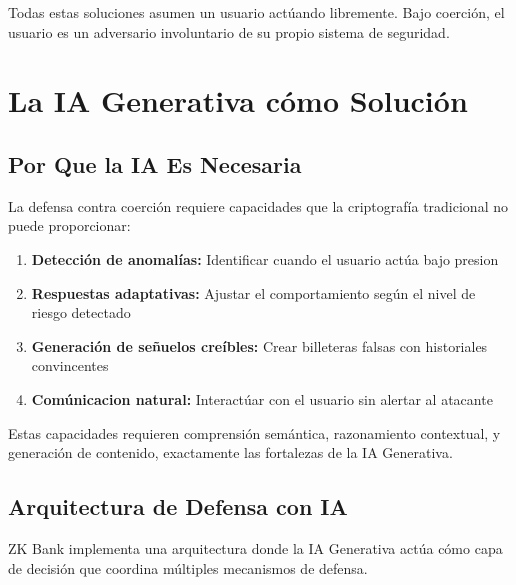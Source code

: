 \documentclass[12pt,a4paper,twoside]{book}
\begin{document}
Todas estas soluciones asumen un usuario actúando libremente. Bajo coerción, el usuario es un adversario involuntario de su propio sistema de seguridad.

\section{La IA Generativa cómo Solución}

\subsection{Por Que la IA Es Necesaria}

La defensa contra coerción requiere capacidades que la criptografía tradicional no puede proporcionar:

\begin{enumerate}
    \item \textbf{Detección de anomalías:} Identificar cuando el usuario actúa bajo presion
    \item \textbf{Respuestas adaptativas:} Ajustar el comportamiento según el nivel de riesgo detectado
    \item \textbf{Generación de señuelos creíbles:} Crear billeteras falsas con historiales convincentes
    \item \textbf{Comúnicacion natural:} Interactúar con el usuario sin alertar al atacante
\end{enumerate}

Estas capacidades requieren comprensión semántica, razonamiento contextual, y generación de contenido, exactamente las fortalezas de la IA Generativa.

\subsection{Arquitectura de Defensa con IA}

ZK Bank implementa una arquitectura donde la IA Generativa actúa cómo capa de decisión que coordina múltiples mecanismos de defensa.
\end{document}
